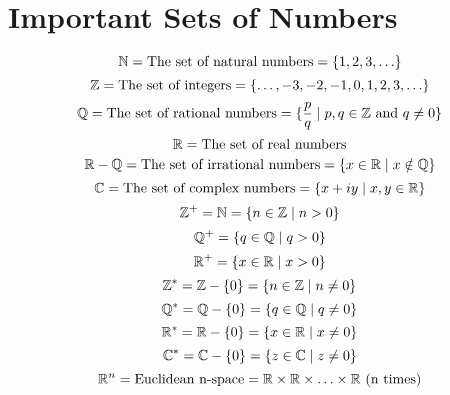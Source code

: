 \documentclass[letterpaper,12pt,fleqn]{article}
\begin{document}
\section*{Important Sets of Numbers}
\[\mathbb{N}=\mbox{The set of natural numbers}=\{1,2,3,\ldots\}\]
\[\mathbb{Z}=\mbox{The set of integers}=\{\ldots,-3,-2,-1,0,1,2,3,\ldots\}\]
\[\mathbb{Q}=\mbox{The set of rational numbers}=
    \{\frac{p}{q}\mid p,q\in\mathbb{Z}\ \mbox{and}\ q\ne0\}\]
\[\mathbb{R}=\mbox{The set of real numbers}\]
\[\mathbb{R}-\mathbb{Q}=\mbox{The set of irrational numbers}=\{x\in\mathbb{R}\mid x\notin\mathbb{Q}\}\]
\[\mathbb{C}=\mbox{The set of complex numbers}=\{x+iy\mid x,y\in\mathbb{R}\}\]
\[\mathbb{Z}^{+}=\mathbb{N}=\{n\in\mathbb{Z}\mid n>0\}\]
\[\mathbb{Q}^{+}=\{q\in\mathbb{Q}\mid q>0\}\]
\[\mathbb{R}^{+}=\{x\in\mathbb{R}\mid x>0\}\]
\[\mathbb{Z}^{*}=\mathbb{Z}-\{0\}=\{n\in\mathbb{Z}\mid n\ne0\}\]
\[\mathbb{Q}^{*}=\mathbb{Q}-\{0\}=\{q\in\mathbb{Q}\mid q\ne0\}\]
\[\mathbb{R}^{*}=\mathbb{R}-\{0\}=\{x\in\mathbb{R}\mid x\ne0\}\]
\[\mathbb{C}^{*}=\mathbb{C}-\{0\}=\{z\in\mathbb{C}\mid z\ne0\}\]
\[\mathbb{R}^{n}=\mbox{Euclidean n-space}=
    \mathbb{R}\times\mathbb{R}\times\ldots\times\mathbb{R}\ \mbox{(n times)}\]
\end{document}
